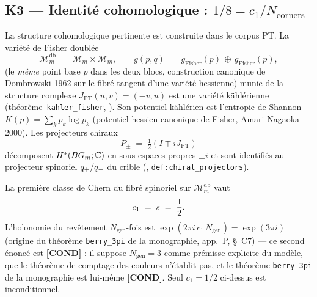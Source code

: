 \subsection{K3 — Identité cohomologique : $1/8 = c_1/N_{\mathrm{corners}}$}
\label{sec:K3}

La structure cohomologique pertinente est construite dans le corpus PT.
La variété de Fisher doublée
\begin{equation}
\mathcal{M}_m^{\mathrm{db}} \;=\; \mathcal{M}_m \times \mathcal{M}_m, \qquad
g(p,q) \;=\; g_{\mathrm{Fisher}}(p) \,\oplus\, g_{\mathrm{Fisher}}(p),
\label{eq:Mdoub}
\end{equation}
(le \emph{même} point base $p$ dans les deux blocs, construction
canonique de Dombrowski 1962 sur le fibré tangent d'une variété
hessienne) munie de la structure complexe $J_{\mathrm{PT}}(u, v) = (-v, u)$
est une variété kählérienne (théorème~\texttt{kahler\_fisher},
\cite{PT_M5}). Son potentiel kählérien est l'entropie de Shannon
$K(p) = \sum_k p_k \log p_k$ (potentiel hessien canonique de Fisher,
Amari-Nagaoka 2000). Les projecteurs chiraux
\begin{equation}
P_{\pm} \;=\; \tfrac{1}{2}(I \mp i J_{\mathrm{PT}})
\label{eq:Pchir}
\end{equation}
décomposent $H^{*}(BG_m; \mathbb{C})$ en sous-espaces propres $\pm i$ et sont
identifiés au projecteur spinoriel $q_{+}/q_{-}$ du crible
(\cite{PT_M5}, \texttt{def:chiral\_projectors}).

\begin{theoreme}
\label{thm:berry_3pi}
La première classe de Chern du fibré spinoriel sur
$\mathcal{M}_m^{\mathrm{db}}$ vaut
\begin{equation}
c_1 \;=\; s \;=\; \dfrac{1}{2}.
\label{eq:c1}
\end{equation}
L'holonomie du revêtement $N_{\mathrm{gen}}$-fois est
$\exp(2\pi i\,c_1\,N_{\mathrm{gen}}) = \exp(3\pi i)$ (origine du
théorème \texttt{berry\_3pi} de la monographie, app.~P, \S~C7) --- ce
second énoncé est \textbf{[COND]} : il suppose $N_{\mathrm{gen}} = 3$
comme prémisse explicite du modèle, que le théorème de comptage des
couleurs n'établit pas, et le théorème \texttt{berry\_3pi} de la
monographie est lui-même \textbf{[COND]}. Seul $c_1 = 1/2$ ci-dessus
est inconditionnel.
\end{theoreme}

